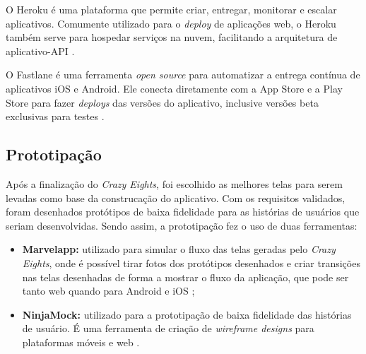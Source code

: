 O Heroku é uma plataforma que permite criar, entregar, monitorar e escalar aplicativos. Comumente utilizado para o \textit{deploy} de aplicações web, o Heroku também serve para hospedar serviços na nuvem, facilitando a arquitetura de aplicativo-API \cite{heroku}.

O Fastlane é uma ferramenta \textit{open source} para automatizar a entrega contínua de aplicativos iOS e Android. Ele conecta diretamente com a App Store e a Play Store para fazer \textit{deploys} das versões do aplicativo, inclusive versões beta exclusivas para testes \cite{fastlane}.

\subsection{Prototipação}

Após a finalização do \textit{Crazy Eights}, foi escolhido as melhores telas para serem levadas como base da construcação do aplicativo. Com os requisitos validados, foram desenhados protótipos de baixa fidelidade para as histórias de usuários que seriam desenvolvidas. Sendo assim, a prototipação fez o uso de duas ferramentas:

\begin{itemize}
    \setlength\itemsep{0em}
    \item \textbf{Marvelapp:} utilizado para simular o fluxo das telas geradas pelo \textit{Crazy Eights}, onde é possível tirar fotos dos protótipos desenhados e criar transições nas telas desenhadas de forma a mostrar o fluxo da aplicação, que pode ser tanto web quando para Android e iOS \cite{marvelapp};
    \item \textbf{NinjaMock:} utilizado para a prototipação de baixa fidelidade das histórias de usuário. É uma ferramenta de criação de \textit{wireframe designs} para plataformas móveis e web \cite{ninjamock}.
\end{itemize}

